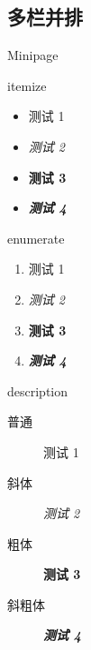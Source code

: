 \subsection{多栏并排}

\begin{frame}{Minipage}


\begin{minipage}{.27\textwidth}
    \begin{block}{}
        \centering itemize
    \end{block}
    \begin{itemize}
        \item 测试 1
        \item \textit{测试 2}
        \item \textbf{测试 3}
        \item \textbf{\textit{测试 4}}
    \end{itemize}
\end{minipage}\quad
\begin{minipage}{.27\textwidth}
    \begin{block}{}
        \centering enumerate
    \end{block}
    \begin{enumerate}
        \item 测试 1
        \item \textit{测试 2}
        \item \textbf{测试 3}
        \item \textbf{\textit{测试 4}}
    \end{enumerate}
\end{minipage}\quad
\begin{minipage}{.35\textwidth}
    \begin{block}{}
        \centering description
    \end{block}
    \begin{description}
        \item[普通] 测试 1
        \item[斜体] \textit{测试 2}
        \item[粗体] \textbf{测试 3}
        \item[斜粗体] \textbf{\textit{测试 4}}
    \end{description}
\end{minipage}
\end{frame}


